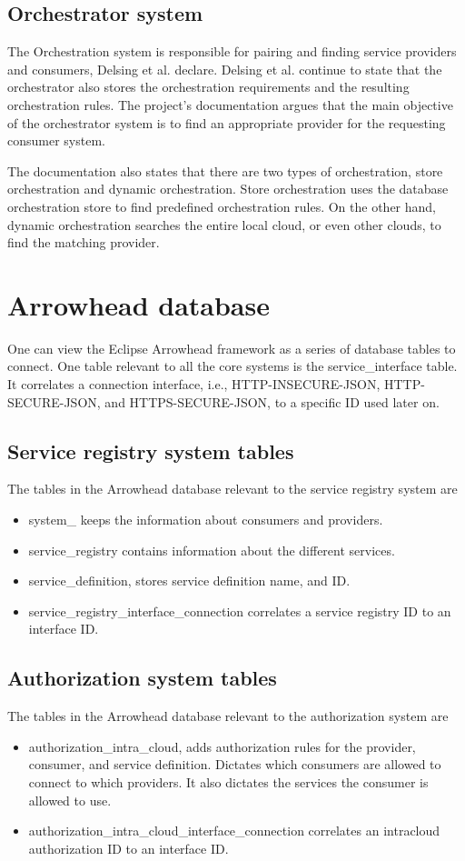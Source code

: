 \subsection{Orchestrator system}
The Orchestration system is responsible for pairing and finding service providers and consumers, Delsing et al. declare.
Delsing et al. continue to state that the orchestrator also stores the orchestration requirements and the resulting orchestration rules.\cite{Delsing2017} 
The project's documentation argues that the main objective of the orchestrator system is to find an appropriate provider for the requesting consumer system.\cite{Github2021}

The documentation also states that there are two types of orchestration, store orchestration and dynamic orchestration.
Store orchestration uses the database orchestration store to find predefined orchestration rules.
On the other hand, dynamic orchestration searches the entire local cloud, or even other clouds, to find the matching provider.\cite{Github2021}
\section{Arrowhead database}
One can view the Eclipse Arrowhead framework as a series of database tables to connect.
One table relevant to all the core systems is the service\_interface table.
It correlates a connection interface, i.e., HTTP-INSECURE-JSON, HTTP-SECURE-JSON, and HTTPS-SECURE-JSON, to a specific ID used later on.
\subsection{Service registry system tables}
The tables in the Arrowhead database relevant to the service registry system are
\begin{itemize}
    \item system\_ keeps the information about consumers and providers. 
    \item service\_registry contains information about the different services.
    \item service\_definition, stores service definition name, and ID.
    \item service\_registry\_interface\_connection correlates a service registry ID to an interface ID.
\end{itemize}
\subsection{Authorization system tables}
The tables in the Arrowhead database relevant to the authorization system are
\begin{itemize}
    \item authorization\_intra\_cloud,  adds authorization rules for the provider, consumer, and service definition. Dictates which consumers are allowed to connect to which providers.  It also dictates the services the consumer is allowed to use.
    \item authorization\_intra\_cloud\_interface\_connection correlates an intracloud authorization ID to an interface ID.
\end{itemize}
